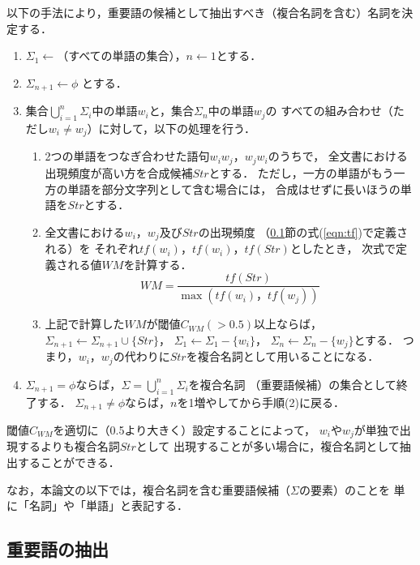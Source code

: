 \documentclass[japanese]{jnlp_1.4}
\begin{document}
以下の手法により，重要語の候補として抽出すべき（複合名詞を含む）名詞を決定する．
\begin{enumerate}
\item $\Sigma_1\leftarrow$（すべての単語の集合），$n \leftarrow 1$とする．

\item $\Sigma_{n+1} \leftarrow \phi$ とする．

\item 集合$\bigcup_{i=1}^n \Sigma_i$中の単語$w_{i}$と，集合$\Sigma_n$中の単語$w_{j}$の
  すべての組み合わせ（ただし$w_i\neq{w_j}$）に対して，以下の処理を行う．
  \begin{enumerate}
  \item 2つの単語をつなぎ合わせた語句$w_{i}w_{j}$，$w_{j}w_{i}$のうちで，
    全文書における出現頻度が高い方を合成候補$Str$とする．
    ただし，一方の単語がもう一方の単語を部分文字列として含む場合には，
    合成はせずに長いほうの単語を$Str$とする．

  \item 全文書における$w_{i}$，$w_{j}$及び$Str$の出現頻度
    （\ref{sec_weight}節の式(\ref{eqn:tf})で定義される）を
    それぞれ$tf(w_i)$，$tf(w_i)$，$tf(Str)$としたとき，
    次式で定義される値$WM$を計算する．
    \[
    WM = \frac{tf(Str)}{\max(tf(w_i)，tf(w_j))}
    \]
  \item 上記で計算した$WM$が閾値$C_{WM}(>0.5)$以上ならば，
    $\Sigma_{n+1} \leftarrow \Sigma_{n+1}\cup\{Str\}$，
    $\Sigma_1 \leftarrow \Sigma_1 - \{w_i\}$，
    $\Sigma_n \leftarrow \Sigma_n - \{w_j\}$とする．
    つまり，$w_{i}$，$w_{j}$の代わりに$Str$を複合名詞として用いることになる．
  \end{enumerate}

\item $\Sigma_{n+1}=\phi$ならば，$\Sigma = \bigcup_{i=1}^n \Sigma_i$を複合名詞
  （重要語候補）の集合として終了する．
  $\Sigma_{n+1}\neq\phi$ならば，$n$を1増やしてから手順(2)に戻る．
\end{enumerate}
閾値$C_{WM}$を適切に（0.5より大きく）設定することによって，
$w_{i}$や$w_{j}$が単独で出現するよりも複合名詞$Str$として
出現することが多い場合に，複合名詞として抽出することができる．

なお，本論文の以下では，複合名詞を含む重要語候補（$\Sigma$の要素）のことを
単に「名詞」や「単語」と表記する．



\subsection{重要語の抽出} \label{sec_weight}
\end{document}
